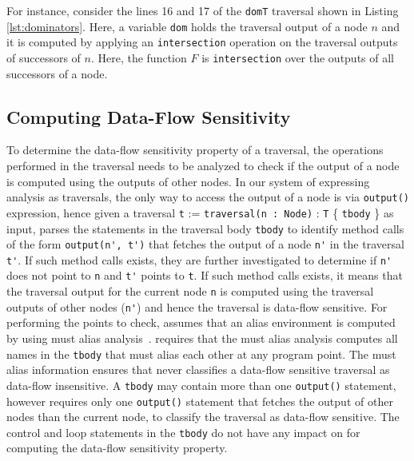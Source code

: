 For instance, consider the lines 16 and 17 of the \lstinline|domT| traversal
shown in Listing \ref{lst:dominators}. Here, a variable \lstinline|dom| holds
the traversal output of a node $n$ and it is computed by applying an
\lstinline|intersection| operation on the traversal outputs of successors of
$n$. Here, the function $F$ is \lstinline|intersection| over the outputs of all
successors of a node.


\subsection{Computing Data-Flow Sensitivity}
\label{sec:df-algo}
To determine the data-flow sensitivity property of a traversal, the operations
performed in the traversal needs to be analyzed to check if the output of a
node is computed using the outputs of other nodes. In our system of expressing
analysis as traversals, the only way to access the output of a node is via
\lstinline|output()| expression, hence given a traversal \lstinline|t| :=
\lstinline|traversal(n : Node)| :
\lstinline|T| \{ \lstinline|tbody| \} as input, 
parses the statements in the traversal body \lstinline|tbody| to identify method
calls of the form \lstinline|output(n', t')| that fetches the output of a node
\lstinline|n'| in the traversal \lstinline|t'|. If such method calls exists,
they are further investigated to determine if \lstinline|n'| does not point to
\lstinline|n| and \lstinline|t'| points to \lstinline|t|.
If such method calls exists, it means that the traversal output for the current
node \lstinline|n| is computed using the traversal outputs of other nodes
(\lstinline|n'|) and hence the traversal is data-flow sensitive.
For performing the points to check,  assumes that
an alias environment is computed by using must alias
analysis~\cite{must-alias}.  requires that
the must alias analysis computes all names in the \lstinline|tbody| that must
alias each other at any program point. The must alias information ensures that
 never classifies a data-flow sensitive traversal
as data-flow insensitive.
A \lstinline|tbody| may contain more than one \lstinline|output()| statement,
however  requires only one \lstinline|output()|
statement that fetches the output of other nodes than the current node, to
classify the traversal as data-flow sensitive. The control and loop statements
in the \lstinline|tbody| do not have any impact on 
for computing the data-flow sensitivity property.

